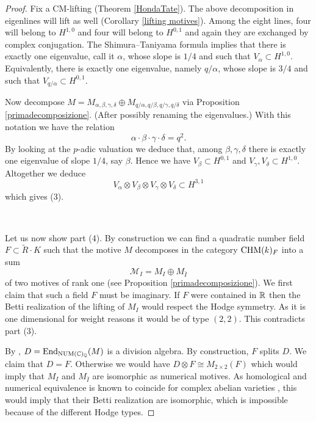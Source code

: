 \documentclass[11pt]{amsart}
\begin{document}
\begin{appendices}
\begin{proof}
Fix a CM-lifting (Theorem \ref{HondaTate}). The above decomposition in eigenlines will lift as well (Corollary \ref{lifting motives}). Among the eight lines, four will belong to $H^{1,0}$ and four will belong to $H^{0,1}$ and again they are exchanged by complex conjugation. The Shimura--Taniyama  formula  \cite[Lemma 5]{TateBour}  implies that there is exactly one eigenvalue, call it $\alpha$, whose slope is $1/4$ and such that
$V_\alpha \subset H^{1,0}$. Equivalently,  there is exactly one eigenvalue, namely $q/\alpha$, whose slope is $3/4$ and such that
$V_{q/\alpha} \subset H^{0,1}$. 

Now decompose $M= M_{\alpha, \beta, \gamma, \delta} \oplus M_{q/\alpha, q/\beta, q/\gamma, q/ \delta}$ via Proposition \ref{primadecomposizione}. (After possibly renaming the eigenvalues.)
With this notation we have the relation 
\[\alpha\cdot \beta \cdot \gamma \cdot \delta=q^2.\]
By looking at the $p$-adic valuation we deduce that, among $\beta, \gamma, \delta$ there is exactly one eigenvalue of slope $1/4$, say $\beta$.  Hence  we have $V_\beta \subset H^{0,1}$ and  $V_\gamma, V_\delta \subset H^{1,0}$. Altogether we deduce
\[V_\alpha \otimes V_\beta \otimes V_\gamma \otimes V_\delta \subset H^{3,1}\]
which gives (3).

\

Let us now show part (4). By construction we can find a quadratic number field $F\subset \tilde{R}\cdot K$   such that the motive $M$  decomposes in the category $\mathrm{CHM} (k)_{F}$ into a sum 
\[\mathcal{M}_{I} = M_{I} \oplus  M_{\bar{I}}  \] of two motives of rank one (see Proposition \ref{primadecomposizione}). We first claim that such a field $F$ must be imaginary. If $F$ were contained in $\mathbb{R}$ then the Betti realization of the lifting of $M_{I}$ would respect the Hodge symmetry. As it is one dimensional for weight reasons it would be of type $(2,2)$. This contradicts part (3).

By \cite{Jann},  $D=\textnormal{End}_{\mathrm{NUM}(\mathbb{C})_{\mathbb{Q}}}  (M)$  is a division algebra. By construction, $F$ splits $D$. We claim that $D=F$. Otherwise we would have $D \otimes F \cong M_{2 \times 2}(F)$ which would imply that $M_{I}$ and $M_{\bar{I}} $ are isomorphic as numerical motives. As homological and numerical equivalence is known to coincide for complex abelian varieties \cite{Lieb}, this would imply that their Betti realization are isomorphic, which is impossible because of the different Hodge types.


\end{proof}
\end{appendices}
\end{document}
